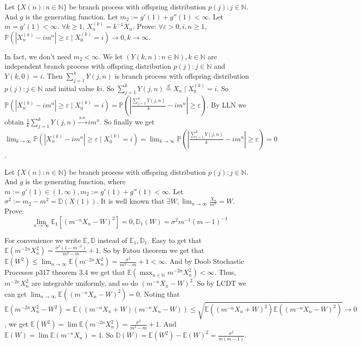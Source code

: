\documentclass[../main]{subfiles}
\begin{document}
\begin{problem}\label{pro:3}
  Let \(\{X(n): n \in \mathbb{N}\}\) be branch process with offspring distribution \(p(j): j \in \mathbb{N}\).
  And \(g\) is the generating function. Let \(m_2:=g'(1) + g''(1) < \infty\).
  Let \(m=g'(1)<\infty\).
  \(\forall k \geq 1\), \(X_n^{(k)}=k^{-1}X_n\).
  Prove: \(\forall \varepsilon >0, i,n \geq 1\), \(\mathbb{P}(|X_n^{(k)} -im^n| \geq \varepsilon \mid X_0^{(k)}=i) \to 0, k \to \infty\).
\end{problem}
\begin{solution}
  In fact, we don't need \(m_2<\infty\).
  We let \((Y(k,n):n \in \mathbb{N}),k \in \mathbb{N}\) are independent branch process with offspring distribution \(p(j):j \in \mathbb{N}\) and \(Y(k,0)=i\).
  Then \(\sum_{j=1}^{k} Y(j,n)\) is branch process with offspring distribution \(p(j):j \in \mathbb{N}\) and initial value \(ki\).
  So \(\sum_{j=1}^{k} Y(j,n) \overset{d}{=} X_n \mid X_0^{(k)}=i\).
  So \(\mathbb{P}(|X_n^{(k)}-im^n|\geq \varepsilon \mid X_0^{(k)}=i)=\mathbb{P}(|\frac{\sum_{j=1}^{k} Y(j,n)}{k}-im^n| \geq \varepsilon)\).
  By LLN we obtain \(\frac{1}{k}\sum_{j=1}^{k} Y(j,n)\overset{\text{a.s.}}{\to} im^n\).
  So finally we get \(\lim_{k \to \infty}\mathbb{P}(|X_n^{(k)}-im^n|\geq \varepsilon \mid X_0^{(k)}=i)=\lim_{k \to \infty}\mathbb{P}(|\frac{\sum_{j=1}^{k} Y(j,n)}{k}-im^n| \geq \varepsilon)=0\).
\end{solution}

\begin{problem}\label{pro:4}
  Let \(\{X(n): n \in \mathbb{N}\}\) be branch process with offspring distribution \(p(j): j \in \mathbb{N}\).
  And \(g\) is the generating function, where \(m :=g' (1) \in (1, \infty), m_2:=g'(1) + g''(1) < \infty\).
  Let \(\sigma^2:=m_2-m^2 = \mathbb{D}(X(1))\).
  It is well known that \(\exists W,\lim_{n \to \infty}\frac{X_n}{m^n} = W\).
  Prove: \[
    \lim_{n \to \infty}\mathbb{E}_1[(m^{-n}X_n -W)^2]= 0, \mathbb{D}_1(W)=\sigma^2 m^{-1}(m-1)^{-1}
  \]
\end{problem}
\begin{solution}
  For convenience we write \(\mathbb{E},\mathbb{D}\) instead of \(\mathbb{E}_1,\mathbb{D}_1\).
  Easy to get that \(\mathbb{E}(m ^{-2n} X_n^2)=\frac{\sigma^2(1-m^{-n})}{m^2-m}+1\).
  So by Fatou theorem we get that \(\mathbb{E}(W^2) \leq \lim_{n \to \infty}\mathbb{E}(m^{-2n}X_n^2)=\frac{\sigma^2}{m^2-m}+1<\infty\).
  And by Doob Stochastic Processes p317 theorem 3.4 we get that
  \(\mathbb{E}(\max_{n \in \mathbb{N}}m^{-2n}X_n^2) < \infty\).
  Thus, \(m^{-2n}X_n^2\) are integrable uniformly, and so do \((m^{-n}X_n-W)^2\).
  So by LCDT we can get \(\lim_{n \to \infty}\mathbb{E}((m^{-n}X_n-W)^2)=0\).
  Noting that
  \[
    \mathbb{E}(m^{-2n}X_n^2-W^2)=\mathbb{E}((m^{-n}X_n+W)(m^{-n}X_n-W)) \leq \sqrt{\mathbb{E}((m^{-n}X_n+W)^2) \mathbb{E}((m^{-n}X_n-W)^2)} \to 0
  \]
  ,
  we get \(\mathbb{E}(W^2)=\lim \mathbb{E}(m^{-2n}X_n^2)=\frac{\sigma^2}{m^2-m}+1\).
  And \(\mathbb{E}(W)=\lim \mathbb{E}(m^{-n}X_n)=1\).
  So \(\mathbb{D}(W)=\mathbb{E}(W^2)-\mathbb{E}(W)^2=\frac{\sigma^2}{m(m-1)}\).
\end{solution}
\end{document}
